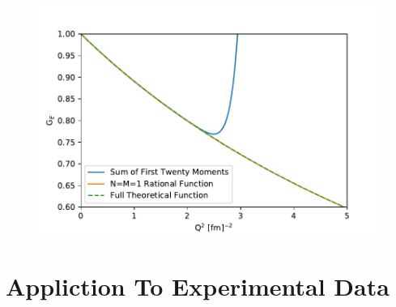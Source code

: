 \documentclass[10pt,aps,prc,twocolumn]{revtex4-1}
\begin{document}
%
%
%
%
%

\begin{figure}
\includegraphics[width=\columnwidth]{Figure/josefunction.pdf}
\end{figure}

\section{Appliction To Experimental Data}
\end{document}
